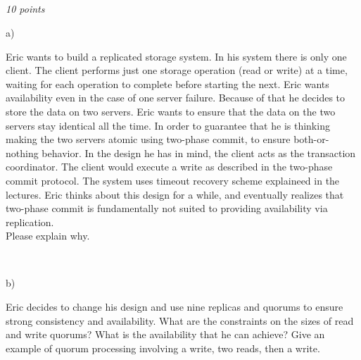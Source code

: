 \documentclass[a4paper]{article}
\newcommand{\points}[1]{\subsection{} \textit{#1 points}\\}
\newcommand{\question}[2][]{
  \noindent
  \parbox[t]{\textwidth}{#1 \parbox[t]{0.95\textwidth}{#2}}\\
}
\begin{document}
\points{10}
\question[a)]{Eric wants to build a replicated storage system. In his
  system there is only one client. The client performs just one
  storage operation (read or write) at a time, waiting for each
  operation to complete before starting the next. Eric wants
  availability even in the case of one server failure. Because of that
  he decides to store the data on two servers. Eric wants to ensure
  that the data on the two servers stay identical all the time. In
  order to guarantee that he is thinking making the two servers atomic
  using two-phase commit, to ensure both-or-nothing behavior. In the
  design he has in mind, the client acts as the transaction
  coordinator. The client would execute a write as described in the
  two-phase commit protocol. The system uses timeout recovery scheme
  explaineed in the lectures. Eric thinks about this design for a
  while, and eventually realizes that two-phase commit is
  fundamentally not suited to providing availability via
  replication. \\
  Please explain why.}
\question[b)]{Eric decides to change his design and use nine replicas
  and quorums to ensure strong consistency and availability. What are
  the constraints on the sizes of read and write quorums? What is the
  availability that he can achieve? Give an example of quorum
  processing involving a write, two reads, then a write.}
% 
\end{document}
